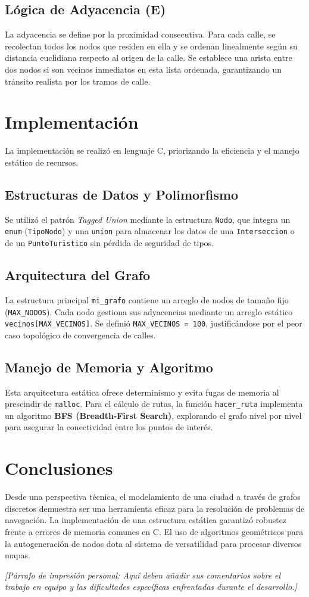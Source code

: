 \documentclass[12pt, a4paper]{article}
\begin{document}
\subsection{Lógica de Adyacencia (E)}
La adyacencia se define por la proximidad consecutiva. Para cada calle, se recolectan todos los nodos que residen en ella y se ordenan linealmente según su distancia euclidiana respecto al origen de la calle. Se establece una arista entre dos nodos si son vecinos inmediatos en esta lista ordenada, garantizando un tránsito realista por los tramos de calle.

\section{Implementación}
La implementación se realizó en lenguaje C, priorizando la eficiencia y el manejo estático de recursos.

\subsection{Estructuras de Datos y Polimorfismo}
Se utilizó el patrón \textit{Tagged Union} mediante la estructura \texttt{Nodo}, que integra un \texttt{enum} (\texttt{TipoNodo}) y una \texttt{union} para almacenar los datos de una \texttt{Interseccion} o de un \texttt{PuntoTuristico} sin pérdida de seguridad de tipos.

\subsection{Arquitectura del Grafo}
La estructura principal \texttt{mi\_grafo} contiene un arreglo de nodos de tamaño fijo (\texttt{MAX\_NODOS}). Cada nodo gestiona sus adyacencias mediante un arreglo estático \texttt{vecinos[MAX\_VECINOS]}. Se definió \texttt{MAX\_VECINOS = 100}, justificándose por el peor caso topológico de convergencia de calles.

\subsection{Manejo de Memoria y Algoritmo}
Esta arquitectura estática ofrece determinismo y evita fugas de memoria al prescindir de \texttt{malloc}. Para el cálculo de rutas, la función \texttt{hacer\_ruta} implementa un algoritmo \textbf{BFS (Breadth-First Search)}, explorando el grafo nivel por nivel para asegurar la conectividad entre los puntos de interés.

\section{Conclusiones}
Desde una perspectiva técnica, el modelamiento de una ciudad a través de grafos discretos demuestra ser una herramienta eficaz para la resolución de problemas de navegación. La implementación de una estructura estática garantizó robustez frente a errores de memoria comunes en C. El uso de algoritmos geométricos para la autogeneración de nodos dota al sistema de versatilidad para procesar diversos mapas.

\textit{[Párrafo de impresión personal: Aquí deben añadir sus comentarios sobre el trabajo en equipo y las dificultades específicas enfrentadas durante el desarrollo.]}
\end{document}
